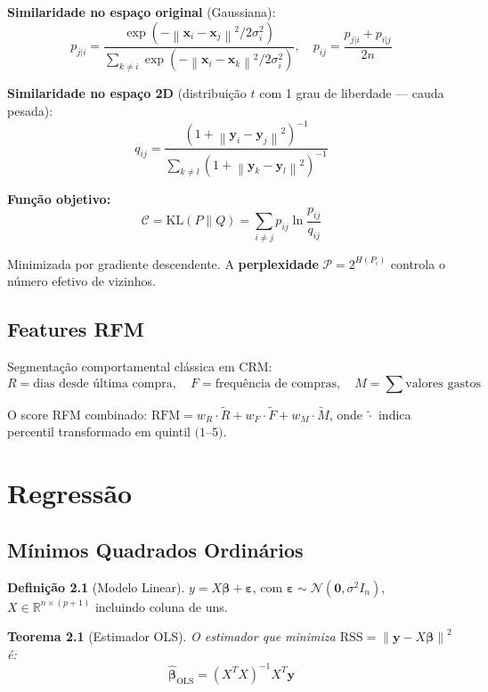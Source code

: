 \documentclass[12pt,a4paper,twoside]{book}
\newtheorem{teorema}{Teorema}[chapter]
\theoremstyle{definition}
\newtheorem{definicao}{Definição}[chapter]
\theoremstyle{remark}
\newcommand{\R}{\mathbb{R}}
\newcommand{\N}{\mathcal{N}}
\newcommand{\bx}{\bm{x}}
\newcommand{\by}{\bm{y}}
\newcommand{\bbeta}{\bm{\beta}}
\newcommand{\norm}[1]{\left\|#1\right\|}
\begin{document}
\textbf{Similaridade no espaço original} (Gaussiana):
\[
p_{j|i} = \frac{\exp(-\norm{\bx_i - \bx_j}^2 / 2\sigma_i^2)}{\sum_{k \neq i} \exp(-\norm{\bx_i - \bx_k}^2 / 2\sigma_i^2)}, \quad p_{ij} = \frac{p_{j|i} + p_{i|j}}{2n}
\]

\textbf{Similaridade no espaço 2D} (distribuição $t$ com 1 grau de liberdade — cauda pesada):
\[
q_{ij} = \frac{(1 + \norm{\by_i - \by_j}^2)^{-1}}{\sum_{k \neq l}(1 + \norm{\by_k - \by_l}^2)^{-1}}
\]

\textbf{Função objetivo:}
\[
\mathcal{C} = \mathrm{KL}(P \| Q) = \sum_{i \neq j} p_{ij} \ln \frac{p_{ij}}{q_{ij}}
\]

Minimizada por gradiente descendente. A \textbf{perplexidade} $\mathcal{P} = 2^{H(P_i)}$ controla o número efetivo de vizinhos.

\section{Features RFM}

Segmentação comportamental clássica em CRM:
\[
R = \text{dias desde última compra}, \quad F = \text{frequência de compras}, \quad M = \sum \text{valores gastos}
\]

O score RFM combinado: $\mathrm{RFM} = w_R \cdot \tilde{R} + w_F \cdot \tilde{F} + w_M \cdot \tilde{M}$, onde $\tilde{\cdot}$ indica percentil transformado em quintil $(1$--$5)$.

\chapter{Regressão}

\section{Mínimos Quadrados Ordinários}

\begin{definicao}[Modelo Linear]
$y = X\bbeta + \bm{\varepsilon}$, com $\bm{\varepsilon} \sim \N(\bm{0}, \sigma^2 I_n)$, $X \in \R^{n \times (p+1)}$ incluindo coluna de uns.
\end{definicao}

\begin{teorema}[Estimador OLS]
O estimador que minimiza $\mathrm{RSS} = \norm{\by - X\bbeta}^2$ é:
\[
\hat{\bbeta}_{\mathrm{OLS}} = (X^TX)^{-1}X^T\by
\]
\end{teorema}
\end{document}
